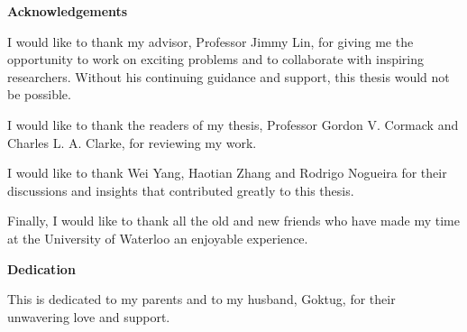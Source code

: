 \cleardoublepage


\begin{center}\textbf{Acknowledgements}\end{center}

I would like to thank my advisor, Professor Jimmy Lin, for giving me the opportunity to work on exciting problems and to collaborate with inspiring researchers.
Without his continuing guidance and support, this thesis would not be possible.

I would like to thank the readers of my thesis, Professor Gordon V. Cormack and Charles L. A. Clarke, for reviewing my work.

I would like to thank Wei Yang, Haotian Zhang and Rodrigo Nogueira for their discussions and insights that contributed greatly to this thesis.

Finally, I would like to thank all the old and new friends who have made my time at the University of Waterloo an enjoyable experience.

\cleardoublepage


\begin{center}\textbf{Dedication}\end{center}

This is dedicated to my parents and to my husband, Goktug, for their unwavering love and support.

\cleardoublepage

\renewcommand\contentsname{Table of Contents}
\tableofcontents
\cleardoublepage
{}    %

\listoffigures
\cleardoublepage
{}		%

\listoftables
\cleardoublepage
{}		%

\printglossaries
\cleardoublepage
{}		%


